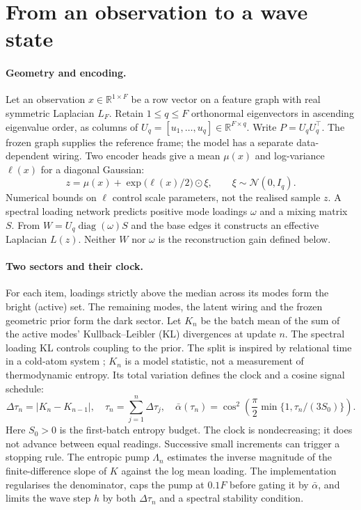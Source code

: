 \documentclass[11pt,a4paper]{article}
\newcommand{\R}{\mathbb{R}}
\newcommand{\U}{U_q}
\DeclareMathOperator{\diag}{diag}
\begin{document}
\section{From an observation to a wave state}
\paragraph{Geometry and encoding.}
Let an observation $x\in\R^{1\times F}$ be a row vector on a feature graph
with real symmetric Laplacian $L_F$. Retain $1\le q\le F$ orthonormal
eigenvectors in ascending eigenvalue order, as columns of
$\U=[u_1,\ldots,u_q]\in\R^{F\times q}$. Write $P=\U\U^\top$.
The frozen graph supplies the reference frame; the model has a separate
data-dependent wiring. Two encoder heads give a mean $\mu(x)$ and
log-variance $\ell(x)$ for a diagonal Gaussian:
\begin{equation}
 z=\mu(x)+\exp\!\bigl(\ell(x)/2\bigr)\odot\xi,\qquad
 \xi\sim\mathcal N(0,I_q).
\end{equation}
Numerical bounds on $\ell$ control scale parameters, not the realised
sample $z$. A spectral loading network predicts positive mode loadings
$\omega$ and a mixing matrix $S$. From
$W=\U\diag(\omega)S$ and the base edges it constructs an effective Laplacian
$L(z)$. Neither $W$ nor $\omega$ is the reconstruction gain defined below.

\paragraph{Two sectors and their clock.}
For each item, loadings strictly above the median across its modes form the
bright (active) set. The remaining modes, the latent wiring and the frozen
geometric prior form the dark sector. Let $K_n$ be the batch mean of the
sum of the active modes' Kullback--Leibler (KL) divergences at update $n$.
The spectral loading KL controls coupling to the prior. The split is
inspired by relational time in a cold-atom system \cite{barontini}; $K_n$
is a model statistic, not a measurement of thermodynamic entropy. Its total
variation defines the clock and a cosine signal schedule:
\begin{equation}
 \Delta\tau_n=|K_n-K_{n-1}|,\quad
 \tau_n=\sum_{j=1}^n\Delta\tau_j,\quad
 \bar\alpha(\tau_n)=\cos^2\!\left(
 \frac{\pi}{2}\min\{1,\tau_n/(3S_0)\}\right).
 \label{eq:clock}
\end{equation}
Here $S_0>0$ is the first-batch entropy budget. The clock is nondecreasing;
it does not advance between equal readings. Successive small increments can
trigger a stopping rule. The entropic pump $\Lambda_n$ estimates the inverse
magnitude of the finite-difference slope of $K$ against the log mean loading.
The implementation regularises the denominator, caps the pump at $0.1F$
before gating it by $\bar\alpha$, and limits the wave step $h$ by both
$\Delta\tau_n$ and a spectral stability condition.
\end{document}
